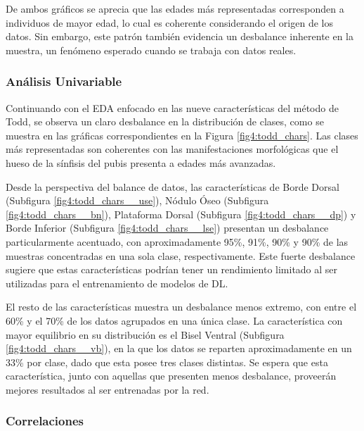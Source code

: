 De ambos gráficos se aprecia que las edades más representadas corresponden a individuos de mayor edad, lo cual es coherente considerando el origen de los datos. Sin embargo, este patrón también evidencia un desbalance inherente en la muestra, un fenómeno esperado cuando se trabaja con datos reales.

\subsubsection{Análisis Univariable}
Continuando con el EDA enfocado en las nueve características del método de Todd, se observa un claro desbalance en la distribución de clases, como se muestra en las gráficas correspondientes en la Figura \ref{fig4:todd_chars}. Las clases más representadas son coherentes con las manifestaciones morfológicas que el hueso de la sínfisis del pubis presenta a edades más avanzadas.

Desde la perspectiva del balance de datos, las características de Borde Dorsal (Subfigura \ref{fig4:todd_chars__use}), Nódulo Óseo (Subfigura \ref{fig4:todd_chars__bn}), Plataforma Dorsal (Subfigura \ref{fig4:todd_chars__dp}) y Borde Inferior (Subfigura \ref{fig4:todd_chars__lse}) presentan un desbalance particularmente acentuado, con aproximadamente 95\%, 91\%, 90\% y 90\% de las muestras concentradas en una sola clase, respectivamente. Este fuerte desbalance sugiere que estas características podrían tener un rendimiento limitado al ser utilizadas para el entrenamiento de modelos de DL.

El resto de las características muestra un desbalance menos extremo, con entre el 60\% y el 70\% de los datos agrupados en una única clase. La característica con mayor equilibrio en su distribución es el Bisel Ventral (Subfigura \ref{fig4:todd_chars__vb}), en la que los datos se reparten aproximadamente en un 33\% por clase, dado que esta posee tres clases distintas. Se espera que esta característica, junto con aquellas que presenten menos desbalance, proveerán mejores resultados al ser entrenadas por la red.

\subsubsection{Correlaciones}

